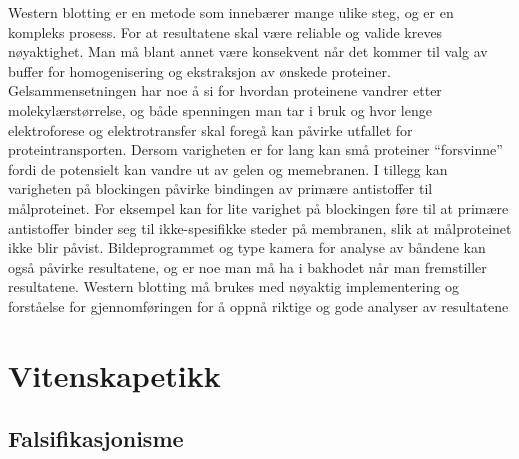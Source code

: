 \documentclass[
]{book}
\begin{document}
Western blotting er en metode som innebærer mange ulike steg, og er en kompleks prosess. For at resultatene skal være reliable og valide kreves nøyaktighet. Man må blant annet være konsekvent når det kommer til valg av buffer for homogenisering og ekstraksjon av ønskede proteiner. Gelsammensetningen har noe å si for hvordan proteinene vandrer etter molekylærstørrelse, og både spenningen man tar i bruk og hvor lenge elektroforese og elektrotransfer skal foregå kan påvirke utfallet for proteintransporten. Dersom varigheten er for lang kan små proteiner ``forsvinne'' fordi de potensielt kan vandre ut av gelen og memebranen. I tillegg kan varigheten på blockingen påvirke bindingen av primære antistoffer til målproteinet. For eksempel kan for lite varighet på blockingen føre til at primære antistoffer binder seg til ikke-spesifikke steder på membranen, slik at målproteinet ikke blir påvist. Bildeprogrammet og type kamera for analyse av båndene kan også påvirke resultatene, og er noe man må ha i bakhodet når man fremstiller resultatene. Western blotting må brukes med nøyaktig implementering og forståelse for gjennomføringen for å oppnå riktige og gode analyser av resultatene \citep{bass2017}

\hypertarget{vitenskapetikk}{%
\chapter{Vitenskapetikk}\label{vitenskapetikk}}

\hypertarget{falsifikasjonisme}{%
\section{Falsifikasjonisme}\label{falsifikasjonisme}}
\end{document}

